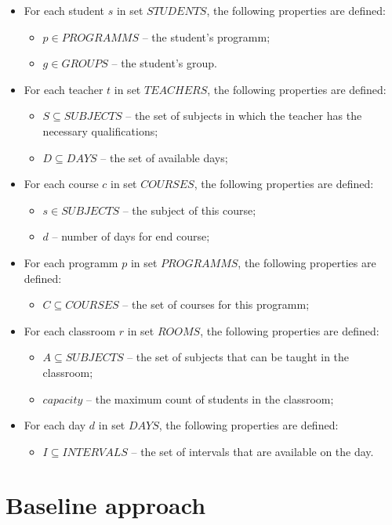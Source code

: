 \documentclass{article}
\begin{document}
\begin{itemize}
    \setlength\itemsep{0.05em}
    \item For each student $s$ in set $STUDENTS$, the following properties are defined:
    \begin{itemize}
        \setlength\itemsep{0.05em}
        \item $p \in PROGRAMMS$ -- the student's programm;
        \item $g \in GROUPS$ -- the student's group.
    \end{itemize}

    \item For each teacher $t$ in set $TEACHERS$, the following properties are defined:
    \begin{itemize}
        \setlength\itemsep{0.05em}
        \item $S \subseteq SUBJECTS$ -- the set of subjects in which the teacher has the necessary qualifications;
        \item $D \subseteq DAYS$ -- the set of available days;
    \end{itemize}

    \item For each course $c$ in set $COURSES$, the following properties are defined:
    \begin{itemize}
        \setlength\itemsep{0.05em}
        \item $s \in SUBJECTS$ -- the subject of this course;
        \item $d$ -- number of days for end course;
    \end{itemize}

    \item For each programm $p$ in set $PROGRAMMS$, the following properties are defined:
    \begin{itemize}
        \setlength\itemsep{0.05em}
        \item $C \subseteq COURSES$ -- the set of courses for this programm;
    \end{itemize}
    
    \item For each classroom $r$ in set $ROOMS$, the following properties are defined:
    \begin{itemize}
        \setlength\itemsep{0.05em}
        \item $A \subseteq SUBJECTS$ -- the set of subjects that can be taught in the classroom;
        \item $capacity$ -- the maximum count of students in the classroom;
    \end{itemize}

    \item For each day $d$ in set $DAYS$, the following properties are defined:
    \begin{itemize}
        \setlength\itemsep{0.05em}
        \item $I \subseteq INTERVALS$ -- the set of intervals that are available on the day.
    \end{itemize}

\end{itemize}

\section{Baseline approach}





\end{document}
